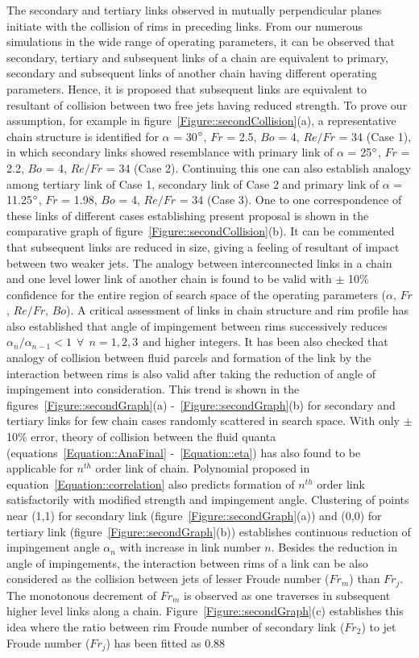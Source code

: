 \documentclass[%
 aip,
 sd,%
amsmath,amssymb,
preprint,%
author-year,%
]{revtex4-1}
\begin{document}
The secondary and tertiary links observed in mutually perpendicular planes initiate with the collision of rims in preceding links. From our numerous simulations in the wide range of operating parameters, it can be observed that secondary, tertiary and subsequent links of a chain are equivalent to primary, secondary and subsequent links of another chain having different operating parameters. Hence, it is proposed that subsequent links are equivalent to resultant of collision between two free jets having reduced strength. To prove our  assumption, for example in figure~\ref{Figure::secondCollision}(a), a representative chain structure is identified for $\alpha$ = 30$\degree$, $Fr$ = 2.5, $Bo$ = 4, $Re/Fr$ = 34 (Case 1), in which secondary links showed resemblance with primary link of $\alpha$ = 25$\degree$, $Fr$ = 2.2, $Bo$ = 4, $Re/Fr$ = 34 (Case 2). Continuing this one can also establish analogy among tertiary link of Case 1, secondary link of Case 2 and primary link of $\alpha$ = 11.25$\degree$, $Fr$ = 1.98, $Bo$ = 4, $Re/Fr$ = 34 (Case 3). One to one correspondence of these links of different cases establishing present proposal is shown in the comparative graph of figure~\ref{Figure::secondCollision}(b). It can be commented that subsequent links are reduced in size, giving a feeling of resultant of impact between two weaker jets. The analogy between interconnected links in a chain and one level lower link of another chain is found to be valid with $\pm$ 10\% confidence for the entire region of search space of the operating parameters ($\alpha$, $Fr$, $Re/Fr$, $Bo$). A critical assessment of links in chain structure and rim profile has also established that angle of impingement between rims successively reduces $\alpha_{n}/\alpha_{n-1} < 1 \:\:\forall\:\: n = 1, 2, 3 \:\:\text{and higher integers}$. It has been also checked that analogy of collision between fluid parcels and formation of the link by the interaction between rims is also valid after taking the reduction of angle of impingement into consideration. This trend is shown in the figures~\ref{Figure::secondGraph}(a) -~\ref{Figure::secondGraph}(b) for secondary and tertiary links for few chain cases randomly scattered in search space. With only $\pm$ 10\% error, theory of collision between the fluid quanta (equations~\ref{Equation::AnaFinal} -~\ref{Equation::eta}) has also found to be applicable for $n^{th}$ order link of chain. Polynomial proposed in equation~\ref{Equation::correlation} also predicts formation of $n^{th}$ order link satisfactorily with modified strength and impingement angle. Clustering of points near (1,1) for secondary link (figure~\ref{Figure::secondGraph}(a)) and (0,0) for tertiary link (figure~\ref{Figure::secondGraph}(b)) establishes continuous reduction of impingement angle $\alpha_{n}$ with increase in link number $n$. Besides the reduction in angle of impingements, the interaction between rims of a link can be also considered as the collision between jets of lesser Froude number ($Fr_m$) than $Fr_j$. The monotonous decrement of $Fr_m$ is observed as one traverses in subsequent higher level links along a chain. Figure~\ref{Figure::secondGraph}(c) establishes this idea where the ratio between rim Froude number of secondary link ($Fr_2$) to jet Froude number ($Fr_j$) has been fitted as 0.88 
\end{document}
